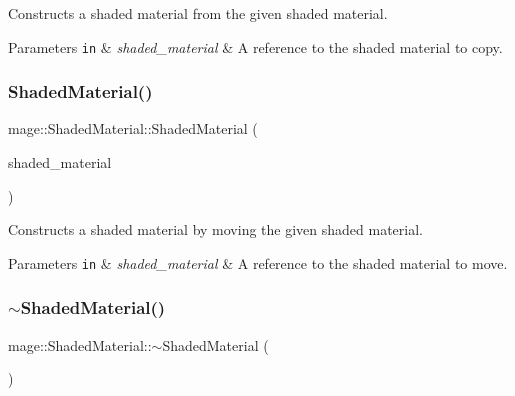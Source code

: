 Constructs a shaded material from the given shaded material.


\begin{DoxyParams}[1]{Parameters}
\mbox{\tt in}  & {\em shaded\+\_\+material} & A reference to the shaded material to copy. \\
\hline
\end{DoxyParams}
\hypertarget{structmage_1_1_shaded_material_acd222233b31513b095e26aa6e38c4a99}{}\label{structmage_1_1_shaded_material_acd222233b31513b095e26aa6e38c4a99} 
\subsubsection{\texorpdfstring{Shaded\+Material()}{ShadedMaterial()}\hspace{0.1cm}{\footnotesize\ttfamily [4/4]}}
{\footnotesize\ttfamily mage\+::\+Shaded\+Material\+::\+Shaded\+Material (\begin{DoxyParamCaption}\item[{\hyperlink{structmage_1_1_shaded_material}{Shaded\+Material} \&\&}]{shaded\+\_\+material }\end{DoxyParamCaption})\hspace{0.3cm}{\ttfamily [default]}}

Constructs a shaded material by moving the given shaded material.


\begin{DoxyParams}[1]{Parameters}
\mbox{\tt in}  & {\em shaded\+\_\+material} & A reference to the shaded material to move. \\
\hline
\end{DoxyParams}
\hypertarget{structmage_1_1_shaded_material_ac7be54322faed90a07b26225e270e571}{}\label{structmage_1_1_shaded_material_ac7be54322faed90a07b26225e270e571} 
\subsubsection{\texorpdfstring{$\sim$\+Shaded\+Material()}{~ShadedMaterial()}}
{\footnotesize\ttfamily mage\+::\+Shaded\+Material\+::$\sim$\+Shaded\+Material (\begin{DoxyParamCaption}{ }\end{DoxyParamCaption})\hspace{0.3cm}{\ttfamily [default]}}

